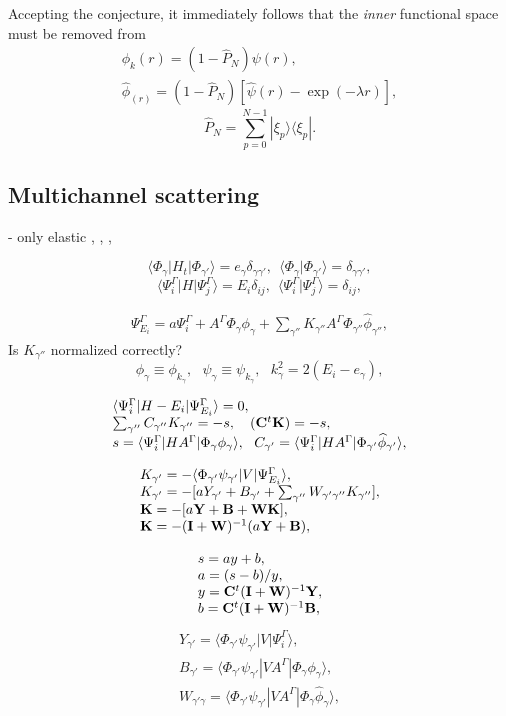 \documentclass[aip
, pra
, showpacs
, aps
, twocolumn
, groupedaddress
, floatfix
]{revtex4}
\newcommand{\beq}{\begin{equation}}
\newcommand{\eeq}{\end{equation}}
\newcommand{\barr}{\begin{array}}
\newcommand{\earr}{\end{array}}
\begin{document}
Accepting the conjecture, it immediately follows that the {\em inner} functional space must be removed from
\beq \barr{l}
\phi_k(r) = (1-\hat{P}_N) \psi(r),\\
\widehat{\phi}_(r) = (1-\hat{P}_N) [\widehat{\psi}(r) - \exp{(-\lambda r)}],
\earr \eeq
\beq
\hat{P}_N = \sum_{p=0}^{N-1} | \xi_p \rangle \langle \xi_p |.
\eeq



\subsection{Multichannel scattering}
\cite{CA73} - only elastic
\cite{NO72},
\cite{TF79},
\cite{Nesbet78}, \cite{Lucchese86}

\beq
\langle \Phi_\gamma|H_t|\Phi_{\gamma'}\rangle=e_\gamma \delta_{\gamma\gamma'}, \ \
 \langle \Phi_\gamma|\Phi_{\gamma'}\rangle=\delta_{\gamma\gamma'},
 \label{psi_H_psi} \eeq
\beq
\langle\Psi_i^\Gamma|H|\Psi_j^\Gamma\rangle=E_i\delta_{ij}, \ \
 \langle\Psi_i^\Gamma|\Psi_j^\Gamma\rangle=\delta_{ij},
\label{Psi_H_Psi} \eeq


\beq \barr{l}
 \Psi_{E_i}^{\Gamma}  =  a \Psi_i^{\Gamma}
 + A^{\Gamma} \Phi_{\gamma}  \phi_{\gamma}
+ \sum_{\gamma''} K_{\gamma''} A^{\Gamma} \Phi_{\gamma''}   \widehat{\phi}_{\gamma''} ,
\earr \label{Psi_} \eeq
Is $K_{\gamma''}$ normalized correctly?
\beq
\phi_{\gamma}\equiv \phi_{k_\gamma}, \ \ \ \psi_{\gamma}\equiv \psi_{k_\gamma}, \ \ \   k_{\gamma}^2 = 2(E_i - e_\gamma),
\eeq


\beq \barr{l}
\langle\Psi_i^\Gamma|H-E_i|\Psi_{E_i}^{\Gamma}\rangle=0,\\
\sum_{\gamma''}  C_{\gamma''} K_{\gamma''}  = -s
, \ \ \ ({\bf C}^t {\bf K}) = -s,\\
s = \langle \Psi_i^\Gamma |HA^{\Gamma} |\Phi_{\gamma} \phi_{\gamma} \rangle,\ \
C_{\gamma'} =  \langle \Psi_i^\Gamma |HA^{\Gamma} |\Phi_{\gamma'} \widehat{\phi}_{\gamma'} \rangle,
\earr \label{Psi_} \eeq

\beq \barr{l}
K_{\gamma'} = - \langle \Phi_{\gamma'}  \psi_{\gamma'}
| V | \Psi_{E_i}^{ \Gamma} \rangle,\\
K_{\gamma'} =   - [a Y_{\gamma'}   + B_{\gamma'}
+ \sum_{\gamma''}  W_{\gamma' \gamma''} K_{\gamma''}],\\
{\bf K} =   -[a {\bf Y} + {\bf B} + {\bf W K}],\\
{\bf K}  = -({\bf I}+{\bf W})^{-1}   (a {\bf Y}    + {\bf B}),
\earr \eeq

\beq \barr{l}
s = a y  + b,   \\
a = (s - b) / y,\\
y = {\bf C}^t ({\bf I}+{\bf W})^{-1}  {\bf Y}, \\
b = {\bf C}^t ({\bf I}+{\bf W})^{-1}  {\bf B},
\earr \eeq
\beq \barr{l}
Y_{\gamma'} = \langle \Phi_{\gamma'}  \psi_{\gamma'} |V |\Psi_i^{\Gamma} \rangle,\\
B_{\gamma'} = \langle \Phi_{\gamma'}  \psi_{\gamma'} |V A^{\Gamma} |\Phi_{\gamma} \phi_{\gamma} \rangle,\\
W_{\gamma' \gamma} = \langle \Phi_{\gamma'}  \psi_{\gamma'} |V A^{\Gamma} |\Phi_{\gamma} \widehat{\phi}_{\gamma} \rangle,\\
\earr \label{Psi_} \eeq
\end{document}
